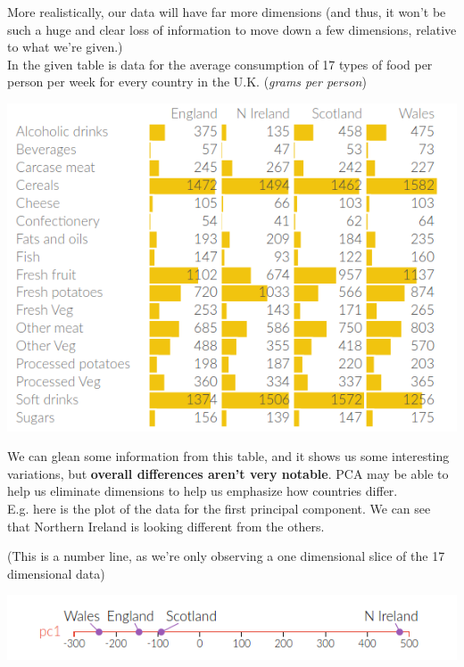 \documentclass[english, 10pt]{article}
\begin{document}
More realistically, our data will have far more dimensions (and thus, it won't be such a huge and clear loss of information to move down a few dimensions, relative to what we're given.)\\

In the given table is data for the average consumption of 17 types of food per person per week for every country in the U.K. (\textit{grams per person})\\

{
\centering

\includegraphics[scale=0.6]{img/17dtable.png} 

}

\hfill \break We can glean some information from this table, and it shows us some interesting variations, but \textbf{overall differences aren't very notable}. PCA may be able to help us eliminate dimensions to help us emphasize how countries differ.\\

E.g. here is the plot of the data for the first principal component. We can see that Northern Ireland is looking different from the others.



\hfill \break (This is a number line, as we're only observing a one dimensional slice of the 17 dimensional data)

{
\centering

\includegraphics[scale=0.6]{img/17dpc1.png} 

}
\end{document}
